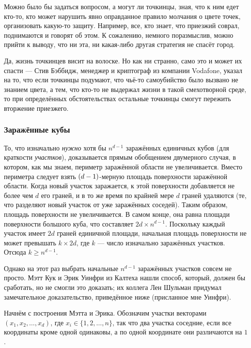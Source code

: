 Можно было бы задаться вопросом, а могут ли точкинцы, зная, что к ним едет кто-то, кто может нарушить явно оправданное правило молчания о цвете точек, организовать какую-то защиту.
Например, все, кто знает, что приезжий соврал, поднимаются и говорят об этом.
К сожалению, немного поразмыслив, можно прийти к выводу, что ни эта, ни какая-либо другая стратегия не спасёт город.

Да, жизнь точкинцев висит на волоске.
Но как ни странно, само это и может их спасти --- Стив Бэббидж, менеджер и криптограф из компании Vodafone, указал на то, что если точкинцы подумают, что чьё-то самоубийство было вызвано не знанием цвета, а тем, что кто-то не выдержал жизни в такой смехотворной среде, то при определённых обстоятельствах остальные точкинцы смогут пережить вторжение приезжего.

\subsubsection*{Заражённые кубы}

То, что изначально \emph{нужно} хотя бы $n^{d-1}$ заражённых единичных кубов (для краткости \emph{участков}), доказывается прямым обобщением двумерного случая, в котором, как мы знаем, периметр заражённой области не увеличивается.
Вместо периметра следует взять $(d\z-1)$-мерную площадь поверхности заражённой области.
Когда новый участок заражается, к этой поверхности добавляется не более чем $d$ его граней,
и в то же время по крайней мере $d$ граней удаляются (те, что разделяют новый участок от уже заражённых соседей).
Таким образом, площадь поверхности не увеличивается.
В самом конце, она равна площади поверхности большого куба, что составляет $2d \times n^{d-1}$.
Поскольку каждый участок имеет $2d$ граней единичной площади,
начальная площадь поверхности не может превышать $k \times 2d$,
где $k$ --- число изначально заражённых участков.
Отсюда $k\geqslant n^{d-1}$.

Однако на этот раз выбрать начальные $n^{d-1}$ заражённых участков совсем не просто.
Мэтт Кук и Эрик Уинфри из Калтеха нашли способ, который, должен бы сработать, но не смогли это доказать;
их коллега Лен Шульман придумал замечательное доказательство, приведённое ниже (присланное мне Уинфри).

Начнём с построения Мэтта и Эрика.
Обозначим участки векторами $(x_1 , x_2 , \dots , x_d )$, где $x_i \in \{1, 2, \dots , n\}$, так что два участка соседние, 
если все координаты кроме одной одинаковы, а по одной координате они различаются на $1$.

